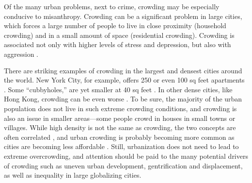 \documentclass[11pt, letterpaper]{article}
\begin{document}
\begin{spacing}{1.4}
%
Of the many urban problems, next to crime, crowding may be especially conducive to
misanthropy.  
Crowding can be a significant problem in large cities, which forces a large number of people to live in close proximity (household crowding) and in a small amount of space (residential crowding). Crowding is associated not only with higher levels of stress and depression, but also with aggression \citep{regoeczi2008,calhoun62}. 

There are striking examples of crowding in the largest and densest cities around
the world. New York City, for example, offers 250 or even 100 sq feet apartments
\citep{abc,yoneda,dailynews}. Some ``cubbyholes,'' are yet smaller at 40 sq feet \citep{newyorktimes}. In other dense cities, like Hong Kong, crowding can be even worse \citep{newyorktimes2}. To
  be sure, the majority of the urban population does not live in such extreme crowding conditions, and crowding is also an issue in smaller areas---some people crowd in houses in small towns or villages.
  While high density is not the same as crowding, the two concepts are often
  correlated \citep{meyer13}, and urban crowding is probably becoming more
  common  as cities are becoming less affordable  \citep[e.g.,][]{misraCL15oct6,floridaCL18apr11,weinbergCL16aug11,solariMISC19apr24,schuetzMISC19may7,kotkin_db_mar20_13}. 
%    
 Still, urbanization does not need to lead to extreme overcrowding, and attention should be
 paid to the many potential drivers of crowding such as  uneven urban
  development, gentrification and displacement, as well as inequality in large
  globalizing cities. 

% 




\end{spacing}
\end{document}
